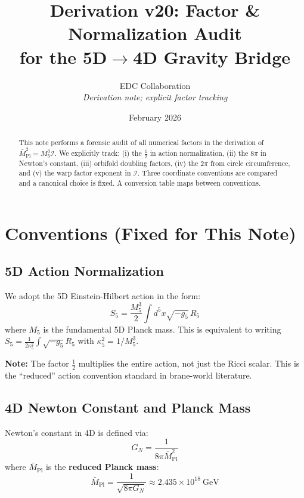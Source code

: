 \documentclass[11pt,a4paper]{article}
\title{Derivation v20: Factor \& Normalization Audit\\
for the 5D$\to$4D Gravity Bridge}
\author{EDC Collaboration\\[3pt]
\small\textit{Derivation note; explicit factor tracking}}
\date{February 2026}
\newcommand{\Mplbar}{\bar{M}_{\mathrm{Pl}}}
\newcommand{\Mfive}{M_5}
\newcommand{\calI}{\mathcal{I}}
\newcommand{\GN}{G_N}
\newcommand{\kfive}{\kappa_5}
\begin{document}
\maketitle

\begin{abstract}
This note performs a forensic audit of all numerical factors in the derivation
of $\Mplbar^2 = \Mfive^3 \calI$. We explicitly track: (i) the $\frac{1}{2}$ in
action normalization, (ii) the $8\pi$ in Newton's constant, (iii) orbifold
doubling factors, (iv) the $2\pi$ from circle circumference, and (v) the warp
factor exponent in $\calI$. Three coordinate conventions are compared and a
canonical choice is fixed. A conversion table maps between conventions.
\end{abstract}

\section{Conventions (Fixed for This Note)}

\subsection{5D Action Normalization}

We adopt the 5D Einstein-Hilbert action in the form:
\begin{equation}
S_5 = \frac{\Mfive^3}{2} \int d^5x \sqrt{-g_5}\, R_5
\label{eq:5D-action}
\end{equation}
where $\Mfive$ is the fundamental 5D Planck mass. This is equivalent to
writing $S_5 = \frac{1}{2\kfive^2}\int\sqrt{-g_5}R_5$ with $\kfive^2 = 1/\Mfive^3$.

\textbf{Note:} The factor $\frac{1}{2}$ multiplies the entire action, not just
the Ricci scalar. This is the ``reduced'' action convention standard in
brane-world literature.

\subsection{4D Newton Constant and Planck Mass}

Newton's constant in 4D is defined via:
\begin{equation}
\GN = \frac{1}{8\pi \Mplbar^2}
\label{eq:GN-def}
\end{equation}
where $\Mplbar$ is the \textbf{reduced Planck mass}:
\begin{equation}
\Mplbar = \frac{1}{\sqrt{8\pi \GN}} \approx 2.435 \times 10^{18}~\mathrm{GeV}
\label{eq:Mplbar-def}
\end{equation}
\end{document}
